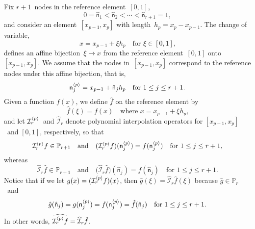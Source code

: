 Fix $r+1$~nodes in the reference element~$[0,1]$,
\begin{equation}\label{eq: ref nodes 1d}
0=\hat{\mathsf{n}}_1<\hat{\mathsf{n}}_2<\cdots<\hat{\mathsf{n}}_{r+1}=1,
\end{equation}
and consider an element~$[x_{p-1},x_p]$ with length~$h_p=x_p-x_{p-1}$.  The 
change of variable,
\[
x = x_{p-1} + \xi h_p\quad\text{for $\xi\in[0,1]$,}
\]
defines an affine bijection~$\xi\mapsto x$ from the reference element~$[0,1]$ 
onto~$[x_{p-1},x_p]$.  We assume that the nodes in~$[x_{p-1},x_p]$ correspond 
to the reference nodes under this affine bijection, that is,
\[
\mathsf{n}_j^{\langle p\rangle}=x_{p-1}+\hat{\mathsf{n}}_jh_p
    \quad\text{for $1\le j\le r+1$.}
\]
Given a function $f(x)$, we define $\hat f$ on the reference element by
\[
\hat f(\xi)=f(x)\quad\text{where $x=x_{p-1}+\xi h_p$,}
\]
and let $\mathcal{I}_r^{\langle p\rangle}$~and $\widehat{\mathcal{I}}_r$ denote 
polynomial interpolation operators for $[x_{p-1},x_p]$~and $[0,1]$, 
respectively, so that
\[
\mathcal{I}_r^{\langle p\rangle}f\in\mathbb{P}_{r+1}\quad\text{and}\quad
(\mathcal{I}_r^{\langle p\rangle}f)(\mathsf{n}_j^{\langle p\rangle})=f(\mathsf{n}_j^{\langle p\rangle})
\quad\text{for $1\le j\le r+1$,}
\]
whereas
\[
\widehat{\mathcal{I}}_r\hat f\in\mathbb{P}_{r+1}\quad\text{and}\quad
\bigl(\widehat{\mathcal{I}}_r\hat f\bigr)(\hat{\mathsf{n}}_j)
    =\hat f(\hat{\mathsf{n}}_j)\quad\text{for $1\le j\le r+1$.}
\]
Notice that if we let $g(x)=(\mathcal{I}_r^{\langle p\rangle}f)(x)$, then 
$\hat g(\xi)=\widehat{\mathcal{I}}_r\hat f(\xi)$ because 
$\hat g\in\mathbb{P}_r$~and 
\[
\hat g(\hat{\mathsf{n}}_j)=g(\mathsf{n}_j^{\langle p\rangle})=f(\mathsf{n}_j^{\langle p\rangle})
    =\hat f(\hat{\mathsf{n}}_j)\quad\text{for $1\le j\le r+1$.}
\]
In other words, 
$\widehat{\mathcal{I}_r^{\langle p\rangle}f}=\widehat{\mathcal{I}}_r\hat f$.

